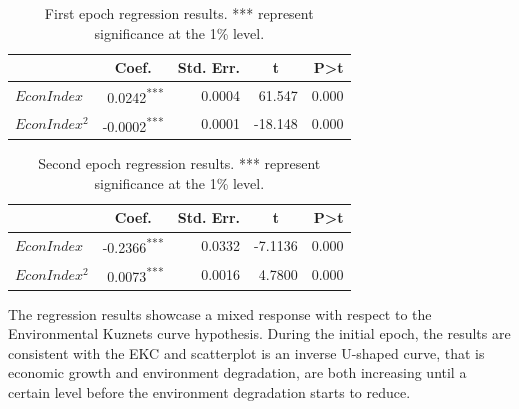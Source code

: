 \documentclass{article}
\begin{document}
\begin{table}[h]
    \centering
    \begin{tabular}{l|rrrr}
    \hline
    \multicolumn{1}{c}{\textbf{}} & \multicolumn{1}{c}{\textbf{Coef.}} & \multicolumn{1}{c}{\textbf{Std. Err.}} & \multicolumn{1}{c}{\textbf{t}} & \textbf{P\textgreater{}t} \\ \hline
    $EconIndex$                     & 0.0242\textsuperscript{***}                             & 0.0004                                 & 61.547     & 0.000                     \\ 
    $EconIndex^2$                   & -0.0002\textsuperscript{***}                            & 0.0001                                 & -18.148    & 0.000                    
    \\ \hline        
\end{tabular}
\caption{First epoch regression results. *** represent significance at the 1\% level.}
\end{table}



\begin{table}[h]
    \centering
    \begin{tabular}{l|rrrr}
    \hline
    \multicolumn{1}{c}{\textbf{}} & \multicolumn{1}{c}{\textbf{Coef.}} & \multicolumn{1}{c}{\textbf{Std. Err.}} & \multicolumn{1}{c}{\textbf{t}} & \textbf{P\textgreater{}t} \\ \hline
    $EconIndex$                     & -0.2366\textsuperscript{***}                             & 0.0332                                 & -7.1136     & 0.000                     \\ 
    $EconIndex^2$                   & 0.0073\textsuperscript{***}                            & 0.0016                                 & 4.7800    & 0.000                    
    \\ \hline        
\end{tabular}
\caption{Second epoch regression results. *** represent significance at the 1\% level.}
\end{table}



The regression results showcase a mixed response with respect to the Environmental Kuznets curve hypothesis. During the initial epoch, the results are consistent with the EKC and scatterplot is an inverse U-shaped curve, that is economic growth and environment degradation, are both increasing until a certain level before the environment degradation starts to reduce.
\end{document}
